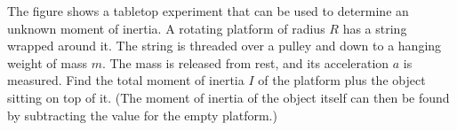 The figure shows a tabletop experiment that can be used to determine
an unknown moment of inertia. A rotating platform of radius $R$ has
a string wrapped around it. The string is threaded over a pulley and
down to a hanging weight of mass $m$. The mass is released from rest,
and its acceleration $a$ is measured. Find the total moment of inertia
$I$ of the platform plus the object sitting on top of it.
(The moment of inertia of the object itself can then be found by
subtracting the value for the empty platform.)\answercheck
